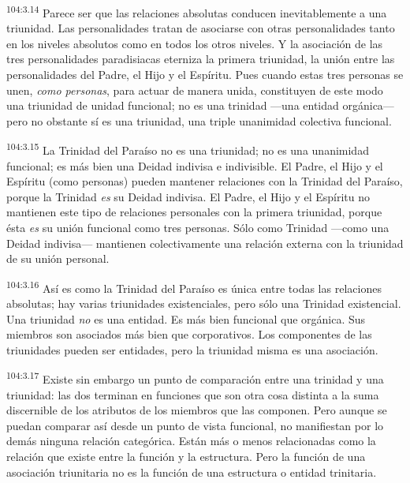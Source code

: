 \par
\textsuperscript{104:3.14} Parece ser que las relaciones absolutas conducen inevitablemente a una triunidad. Las personalidades tratan de asociarse con otras personalidades tanto en los niveles absolutos como en todos los otros niveles. Y la asociación de las tres personalidades paradisiacas eterniza la primera triunidad, la unión entre las personalidades del Padre, el Hijo y el Espíritu. Pues cuando estas tres personas se unen, \textit{como personas}, para actuar de manera unida, constituyen de este modo una triunidad de unidad funcional; no es una trinidad ---una entidad orgánica--- pero no obstante sí es una triunidad, una triple unanimidad colectiva funcional.

\par
\textsuperscript{104:3.15} La Trinidad del Paraíso no es una triunidad; no es una unanimidad funcional; es más bien una Deidad indivisa e indivisible. El Padre, el Hijo y el Espíritu (como personas) pueden mantener relaciones con la Trinidad del Paraíso, porque la Trinidad \textit{es} su Deidad indivisa. El Padre, el Hijo y el Espíritu no mantienen este tipo de relaciones personales con la primera triunidad, porque ésta \textit{es} su unión funcional como tres personas. Sólo como Trinidad ---como una Deidad indivisa--- mantienen colectivamente una relación externa con la triunidad de su unión personal.

\par
\textsuperscript{104:3.16} Así es como la Trinidad del Paraíso es única entre todas las relaciones absolutas; hay varias triunidades existenciales, pero sólo una Trinidad existencial. Una triunidad \textit{no} es una entidad. Es más bien funcional que orgánica. Sus miembros son asociados más bien que corporativos. Los componentes de las triunidades pueden ser entidades, pero la triunidad misma es una asociación.

\par
\textsuperscript{104:3.17} Existe sin embargo un punto de comparación entre una trinidad y una triunidad: las dos terminan en funciones que son otra cosa distinta a la suma discernible de los atributos de los miembros que las componen. Pero aunque se puedan comparar así desde un punto de vista funcional, no manifiestan por lo demás ninguna relación categórica. Están más o menos relacionadas como la relación que existe entre la función y la estructura. Pero la función de una asociación triunitaria no es la función de una estructura o entidad trinitaria.

